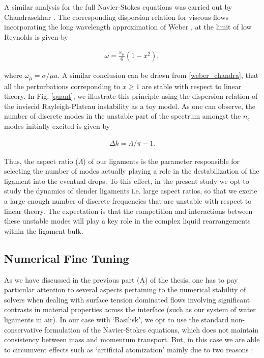 A similar analysis for the full Navier-Stokes equations 
was carried out by Chandrasekhar \cite{chandra}. 
The corresponding dispersion relation for viscous 
flows incorporating the long wavelength approximation 
of Weber \cite{weber1931}, at the limit of low Reynolds is given by

\begin{align}
\omega = \frac{\omega_\mu}{6}\left(1 - x^2 \right) , 
\label{weber_chandra}
\end{align}

where $\omega_\mu = \sigma / \mu a $. 
A similar conclusion can be drawn from \eqref{weber_chandra},
that all the perturbations correponding to $x \geq 1 $ are 
stable with respect to linear theory. 
\marginnote{
}
In Fig. \ref{quant}, we illustrate this principle using the dispersion 
relation of the inviscid Rayleigh-Plateau instability as a toy model. 
As one can observe, the number of discrete modes in the unstable part
of the spectrum amongst the $n_c$ modes initially excited is given by 

\begin{align}
 \Delta k = \Lambda / \pi - 1 .  
\end{align}

Thus, the aspect ratio ($\Lambda$) of our ligaments is the parameter 
responsible for selecting the number of modes actually playing a 
role in the destabilization of the ligament into the eventual drops. 
To this effect, in the present study we opt to study the dynamics of 
slender ligaments i.e. large aspect ratios, so that we excite a large enough 
number of discrete frequencies that are unstable with respect to linear theory. 
The expectation is that the competition and interactions 
between these unstable modes will play a key role in the
complex liquid rearrangements within the ligament bulk. 

\subsection*{Numerical Fine Tuning}
As we have discussed in the previous part (A) of the thesis,  
one has to pay particular attention to several aspects pertaining to 
the numerical stability of solvers when dealing with surface tension 
dominated flows involving significant contrasts in material properties 
across the interface (such as our system of water ligaments in air). 
In our case with `Basilisk', we opt to use the standard non-conservative
formulation of the Navier-Stokes equations, which does not maintain 
consistency between mass and momentum transport. 
But, in this case we are able to circumvent effects such as `artificial
atomization' mainly due to two reasons :

